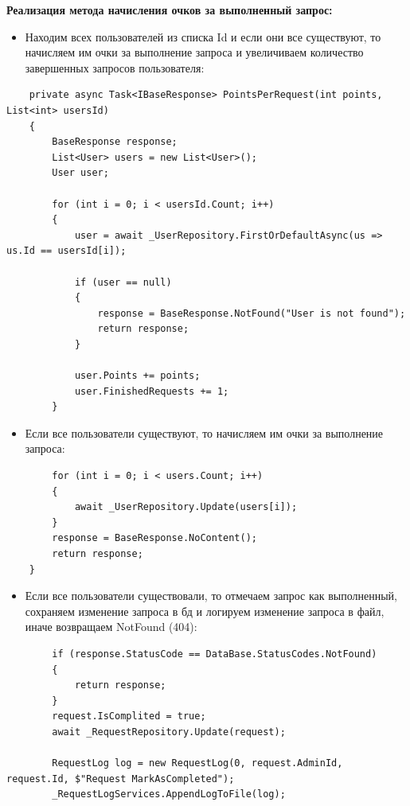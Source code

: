 \textbf{Реализация метода начисления очков за выполненный запрос:}
\begin{itemize}
	\item{Находим всех пользователей из списка Id и если они все существуют, то начисляем им очки за выполнение запроса и увеличиваем количество завершенных запросов пользователя:}
\end{itemize}
\begin{verbatim}
    private async Task<IBaseResponse> PointsPerRequest(int points, List<int> usersId)
    {
        BaseResponse response;
        List<User> users = new List<User>();
        User user;

        for (int i = 0; i < usersId.Count; i++)
        {
            user = await _UserRepository.FirstOrDefaultAsync(us => us.Id == usersId[i]);

            if (user == null)
            {
                response = BaseResponse.NotFound("User is not found");
                return response;
            }

            user.Points += points;
            user.FinishedRequests += 1;
        }
\end{verbatim}

\begin{itemize}
	\item{Если все пользователи существуют, то начисляем им очки за выполнение запроса:}
\end{itemize}
\begin{verbatim}
        for (int i = 0; i < users.Count; i++)
        {
            await _UserRepository.Update(users[i]);
        }
        response = BaseResponse.NoContent();
        return response;
    }
\end{verbatim}

\begin{itemize}
	\item{Если все пользователи существовали, то отмечаем запрос как выполненный, сохраняем изменение запроса в бд и логируем изменение запроса в файл, иначе возвращаем NotFound (404):}
\end{itemize}
\begin{verbatim}
        if (response.StatusCode == DataBase.StatusCodes.NotFound)
        {
            return response;
        }
        request.IsComplited = true;
        await _RequestRepository.Update(request);

        RequestLog log = new RequestLog(0, request.AdminId, request.Id, $"Request MarkAsCompleted");
        _RequestLogServices.AppendLogToFile(log);
\end{verbatim}

